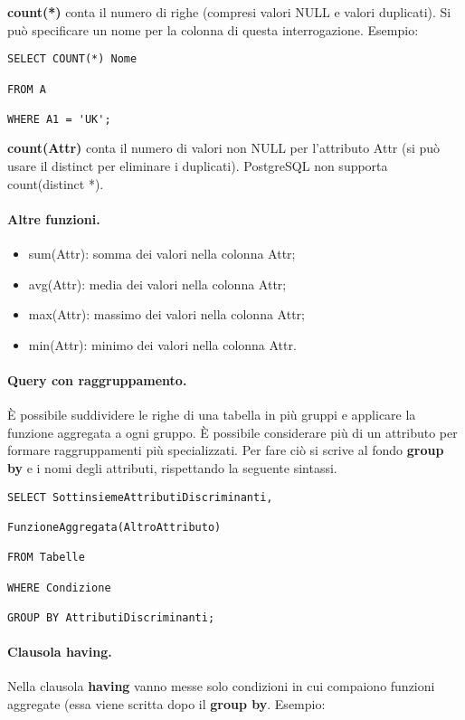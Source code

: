 \textbf{count(*)} conta il numero di righe (compresi valori NULL e valori duplicati). Si può specificare un nome per la colonna di questa interrogazione. Esempio:

\begin{lstlisting}[style=SQL, caption=Count]
SELECT COUNT(*) Nome

FROM A

WHERE A1 = 'UK';
\end{lstlisting}

\textbf{count(Attr)} conta il numero di valori non NULL per l'attributo Attr (si può usare il distinct per eliminare i duplicati). PostgreSQL non supporta count(distinct *).

\paragraph{Altre funzioni.}

\begin{itemize}
    \item sum(Attr): somma dei valori nella colonna Attr;
    \item avg(Attr): media dei valori nella colonna Attr;
    \item max(Attr): massimo dei valori nella colonna Attr;
    \item min(Attr): minimo dei valori nella colonna Attr.
\end{itemize}

\paragraph{Query con raggruppamento.} È possibile suddividere le righe di una tabella in più gruppi e applicare la funzione aggregata a ogni gruppo. È possibile considerare più di un attributo per formare raggruppamenti più specializzati. Per fare ciò si scrive al fondo \textbf{group by} e i nomi degli attributi, rispettando la seguente sintassi.

\begin{lstlisting}[style=SQL, caption=Query con raggruppamento]
SELECT SottinsiemeAttributiDiscriminanti,
    
FunzioneAggregata(AltroAttributo)

FROM Tabelle

WHERE Condizione

GROUP BY AttributiDiscriminanti;
\end{lstlisting}

\paragraph{Clausola having.} Nella clausola \textbf{having} vanno messe solo condizioni in cui compaiono funzioni aggregate (essa viene scritta dopo il \textbf{group by}. Esempio:

